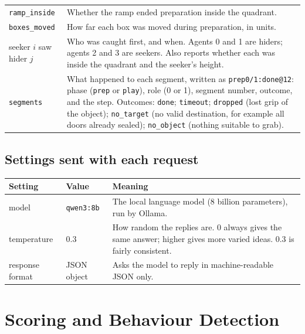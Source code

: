 \documentclass[11pt]{article}
\begin{document}
\begin{tabularx}{\linewidth}{@{}l Y@{}}
  \texttt{ramp\_inside} & Whether the ramp ended preparation inside the quadrant. \\
  \texttt{boxes\_moved} & How far each box was moved during preparation, in units. \\
  seeker $i$ saw hider $j$ & Who was caught first, and when. Agents 0 and 1 are hiders; agents 2
                         and 3 are seekers. Also reports whether each was inside the quadrant and the
                         seeker's height. \\
  \texttt{segments} & What happened to each segment, written as \texttt{prep0/1:done@12}: phase
                         (\texttt{prep} or \texttt{play}), role (0 or 1), segment number, outcome, and the
                         step. Outcomes: \texttt{done}; \texttt{timeout}; \texttt{dropped} (lost grip of
                         the object); \texttt{no\_target} (no valid destination, for example all doors
                         already sealed); \texttt{no\_object} (nothing suitable to grab). \\
  \bottomrule
\end{tabularx}

\subsection{Settings sent with each request}
\label{sec:settings}

\begin{tabularx}{\linewidth}{@{}l l Y@{}}
  \toprule
  Setting & Value & Meaning \\
  \midrule
  model           & \texttt{qwen3:8b} & The local language model (8 billion parameters), run by Ollama. \\
  temperature     & 0.3 & How random the replies are. 0 always gives the same answer; higher gives more
                          varied ideas. 0.3 is fairly consistent. \\
  response format & JSON object & Asks the model to reply in machine-readable JSON only. \\
  \bottomrule
\end{tabularx}

\section{Scoring and Behaviour Detection}
\end{document}

